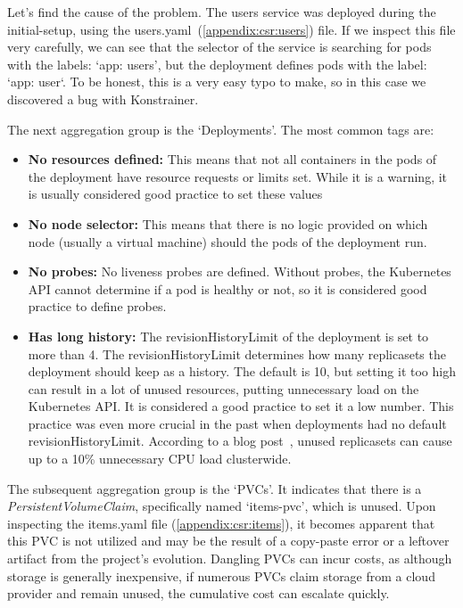 Let's find the cause of the problem. The users service was deployed during the initial-setup, using the users.yaml~(\ref{appendix:csr:users}) file. If we inspect this file very carefully, we can see that the selector of the service is searching for pods with the labels: `app: users', but the deployment defines pods with the label: `app: user`. To be honest, this is a very easy typo to make, so in this case we discovered a bug with Konstrainer.

The next aggregation group is the `Deployments'. The most common tags are:

\begin{itemize}
  \item \textbf{No resources defined:} This means that not all containers in the pods of the deployment have resource requests or limits set. While it is a warning, it is usually considered good practice to set these values
  \item \textbf{No node selector:} This means that there is no logic provided on which node (usually a virtual machine) should the pods of the deployment run.
  \item \textbf{No probes:} No liveness probes are defined. Without probes, the Kubernetes API cannot determine if a pod is healthy or not, so it is considered good practice to define probes.
  \item \textbf{Has long history:} The revisionHistoryLimit of the deployment is set to more than 4. The revisionHistoryLimit determines how many replicasets the deployment should keep as a history. The default is 10, but setting it too high can result in a lot of unused resources, putting unnecessary load on the Kubernetes API. It is considered a good practice to set it a low number. This practice was even more crucial in the past when deployments had no default revisionHistoryLimit. According to a blog post~\cite{RevisionHystory}, unused replicasets can cause up to a 10\% unnecessary CPU load clusterwide.
\end{itemize}

The subsequent aggregation group is the `PVCs'. It indicates that there is a \emph{PersistentVolumeClaim}, specifically named `items-pvc', which is unused. Upon inspecting the items.yaml file (\ref{appendix:csr:items}), it becomes apparent that this PVC is not utilized and may be the result of a copy-paste error or a leftover artifact from the project's evolution. Dangling PVCs can incur costs, as although storage is generally inexpensive, if numerous PVCs claim storage from a cloud provider and remain unused, the cumulative cost can escalate quickly. 

